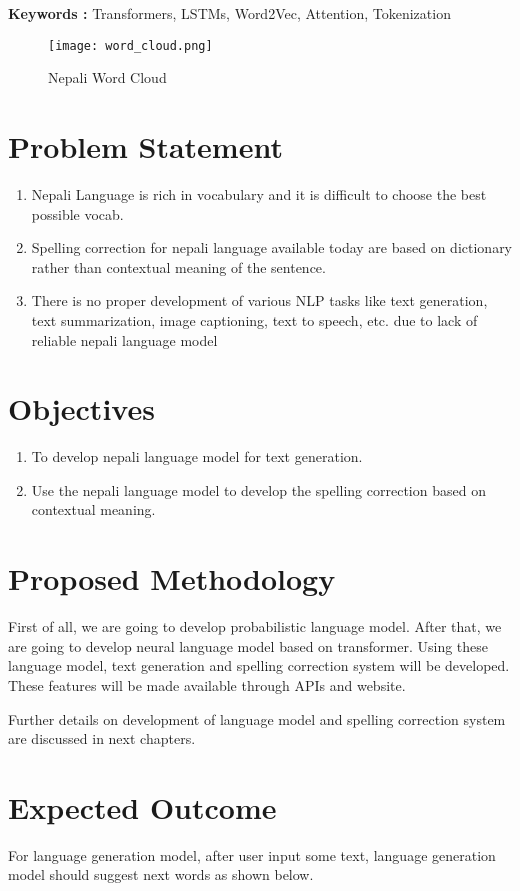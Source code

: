 \textbf{Keywords : } Transformers, LSTMs, Word2Vec, Attention, Tokenization

\begin{figure}[H]
    \centering
    \texttt{[image: word\_cloud.png]}
    \caption{Nepali Word Cloud}
    \label{fig:Nepali Word Cloud}
\end{figure}

\section{Problem Statement}
\begin{enumerate}
    \item Nepali Language is rich in vocabulary and it is difficult to choose the best possible vocab.
    \item Spelling correction for nepali language available today are based on dictionary rather than contextual meaning of the sentence.
    \item There is no proper development of various NLP tasks like text generation, text summarization, image captioning, text to speech, etc. due to lack of reliable nepali language model
\end{enumerate}

\section{Objectives}
\begin{enumerate}
    \item To develop nepali language model for text generation.
    \item Use the nepali language model to develop the spelling correction based on contextual meaning.
\end{enumerate}

\section{Proposed Methodology}
First of all, we are going to develop probabilistic language model.  After that, we are going to develop neural language model based on transformer. Using these language model, text generation and spelling correction system will be developed. These features will be made available through APIs and website.

Further details on development of language model and spelling correction system are discussed in next chapters.

\section{Expected Outcome}
For language generation model, after user input some text, language generation model should suggest next words as shown below.

